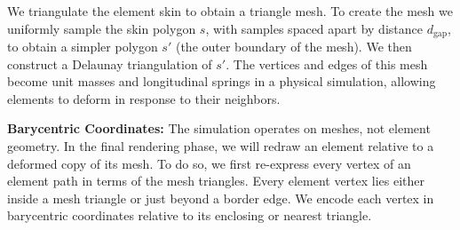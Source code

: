We triangulate the element skin to obtain a triangle mesh.
To create the mesh we uniformly sample the skin polygon $s$, with samples
spaced apart by distance $d_\mathrm{gap}$,
to obtain a simpler polygon $s'$ (the outer boundary of the mesh).
We then construct a Delaunay triangulation of $s'$.
The vertices and edges of this mesh become unit 
masses and longitudinal
springs in a physical simulation, allowing elements to deform in response to
their neighbors.  


\textbf{Barycentric Coordinates:}
The simulation operates on meshes, not element geometry.  In the final
rendering phase, we will redraw an element relative to a deformed copy of
its mesh.  To do so, we first re-express every vertex of an element path in 
terms of the mesh triangles.  Every element vertex lies either inside a mesh
triangle or just beyond a border edge.  We encode each vertex in barycentric
coordinates relative to its enclosing or nearest triangle.

